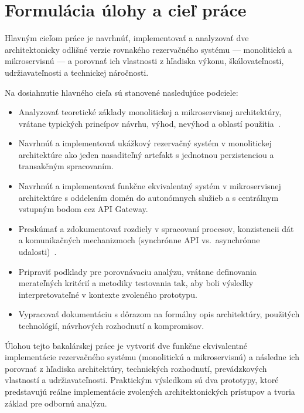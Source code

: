 \chapter{Formulácia úlohy a cieľ práce}\label{ch:goals}

Hlavným cieľom práce je navrhnúť, implementovať a analyzovať dve architektonicky odlišné verzie rovnakého rezervačného systému — monolitickú a mikroservisnú — a porovnať ich vlastnosti z hľadiska výkonu, škálovateľnosti, udržiavateľnosti a technickej náročnosti.

Na dosiahnutie hlavného cieľa sú stanovené nasledujúce podciele:
\begin{itemize}
    \item Analyzovať teoretické základy monolitickej a mikroservisnej architektúry, vrátane typických princípov návrhu, výhod, nevýhod a oblastí použitia~\cite{Newman2021,Richardson2018}.
    \item Navrhnúť a implementovať ukážkový rezervačný systém v monolitickej architektúre ako jeden nasaditeľný artefakt s jednotnou perzistenciou a transakčným spracovaním.
    \item Navrhnúť a implementovať funkčne ekvivalentný systém v mikroservisnej architektúre s oddelením domén do autonómnych služieb a s centrálnym vstupným bodom cez API Gateway.
    \item Preskúmať a zdokumentovať rozdiely v spracovaní procesov, konzistencii dát a komunikačných mechanizmoch (synchrónne API vs.\ asynchrónne udalosti)~\cite{Richardson2018}.
    \item Pripraviť podklady pre porovnávaciu analýzu, vrátane definovania merateľných kritérií a metodiky testovania tak, aby boli výsledky interpretovateľné v kontexte zvoleného prototypu.
    \item Vypracovať dokumentáciu s dôrazom na formálny opis architektúry, použitých technológií, návrhových rozhodnutí a kompromisov.
\end{itemize}

Úlohou tejto bakalárskej práce je vytvoriť dve funkčne ekvivalentné implementácie rezervačného systému (monolitickú a mikroservisnú) a následne ich porovnať z hľadiska architektúry, technických rozhodnutí, prevádzkových vlastností a udržiavateľnosti. Praktickým výsledkom sú dva prototypy, ktoré predstavujú reálne implementácie zvolených architektonických prístupov a tvoria základ pre odbornú analýzu.

